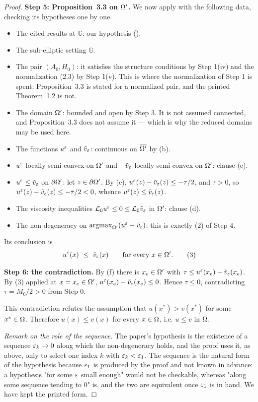 \begin{proof}
\medskip\noindent\textbf{Step 5: Proposition~3.3 on $\Omega'$.} We now apply
 with the following data, checking its hypotheses
one by one.
\begin{itemize}
\item The cited results at $\mathbb G$: our hypothesis ().
\item The sub-elliptic setting $\mathbb G$.
\item The pair $(A_0,H_0)$: it satisfies the structure conditions by Step 1(iv) and the
  normalization (2.3) by Step 1(v). This is where the normalization of Step 1 is spent;
  Proposition~3.3 is stated for a normalized pair, and the printed Theorem~1.2 is not.
\item The domain $\Omega'$: bounded and open by Step 3. It is not assumed connected, and
  Proposition~3.3 does not assume it --- which is why the reduced domains may be used here.
\item The functions $u^{\varepsilon}$ and $\tilde v_{\varepsilon}$: continuous on $\overline{\Omega'}$ by (b).
\item $u^{\varepsilon}$ locally semi-convex on $\Omega'$ and $-\tilde v_{\varepsilon}$ locally semi-convex on
  $\Omega'$: clause (c).
\item $u^{\varepsilon}\le\tilde v_{\varepsilon}$ on $\partial\Omega'$: let $z\in\partial\Omega'$. By (e),
  $u^{\varepsilon}(z)-\tilde v_{\varepsilon}(z)\le-\tau/2$, and $\tau>0$, so
  $u^{\varepsilon}(z)-\tilde v_{\varepsilon}(z)\le-\tau/2<0$, whence $u^{\varepsilon}(z)\le\tilde v_{\varepsilon}(z)$.
\item The viscosity inequalities $\mathcal L_0u^{\varepsilon}\le0\le\mathcal L_0\tilde v_{\varepsilon}$ in
  $\Omega'$: clause (d).
\item The non-degeneracy on $\operatorname*{argmax}_{\Omega'}(u^{\varepsilon}-\tilde v_{\varepsilon})$: this is exactly (2)
  of Step 4.
\end{itemize}
Its conclusion is
\[
 u^{\eps}(x)\ \le\ \tilde v_{\eps}(x)\qquad\text{for every }x\in\Om' . \tag{3}
\]

\medskip\noindent\textbf{Step 6: the contradiction.} By (f) there is $x_e\in\Omega'$ with
$\tau\le u^{\varepsilon}(x_e)-\tilde v_{\varepsilon}(x_e)$. By (3) applied at $x=x_e\in\Omega'$,
$u^{\varepsilon}(x_e)-\tilde v_{\varepsilon}(x_e)\le0$. Hence $\tau\le0$, contradicting $\tau=M_0/2>0$
from Step 0.

This contradiction refutes the assumption that $u(x^{*})>v(x^{*})$ for some $x^{*}\in\Omega$.
Therefore $u(x)\le v(x)$ for every $x\in\Omega$, i.e. $u\le v$ in $\Omega$.

\medskip\noindent\emph{Remark on the role of the sequence.} The paper's hypothesis is the
existence of a sequence $\varepsilon_k\to0$ along which the non-degeneracy holds, and the proof uses
it, as above, only to select one index $k$ with $\varepsilon_k<\varepsilon_1$. The sequence is the natural
form of the hypothesis because $\varepsilon_1$ is produced by the proof and not known in advance: a
hypothesis "for some $\varepsilon$ small enough" would not be checkable, whereas "along some
sequence tending to $0$" is, and the two are equivalent once $\varepsilon_1$ is in hand. We have
kept the printed form.
\end{proof}

